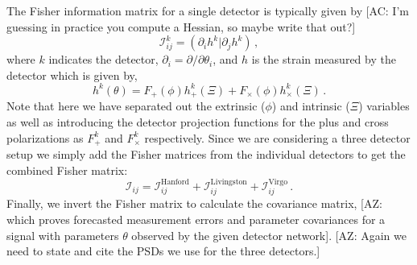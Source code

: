 \documentclass[twocolumn]{aastex631}
\newcommand{\AZ}[1]{{\color{Burnt}[AZ: #1]}}
\newcommand{\amc}[1]{{\color{red}[AC: #1]}}
\begin{document}
The Fisher information matrix for a single detector is typically given by \amc{I'm guessing in practice you compute a Hessian, so maybe write that out?}
\begin{equation}
    \label{eq:fisher}
    \mathcal{I}^{k}_{ij} = (\partial_i h^k | \partial_j h^k) \, ,
\end{equation}
where $k$ indicates the detector, $\partial_i = \partial/\partial \theta_i$, and $h$ is the strain measured by the detector which is given by,
\begin{equation}
    h^k(\theta) = F_+(\phi) h^k_{+}(\Xi) + F_\times(\phi) h^k_{\times}(\Xi) \, .
\end{equation}
Note that here we have separated out the extrinsic ($\phi$) and intrinsic ($\Xi$) variables as well as introducing the detector projection functions for the plus and cross polarizations as $F^k_+$ and $F^k_\times$ respectively.
Since we are considering a three detector setup we simply add the Fisher matrices from the individual detectors to get the combined Fisher matrix:
\begin{equation}
    \mathcal{I}_{ij} =  \mathcal{I}^{\mathrm{Hanford}}_{ij} + \mathcal{I}^{\mathrm{Livingston}}_{ij} + \mathcal{I}^{\mathrm{Virgo}}_{ij}   \, .
\end{equation}
Finally, we invert the Fisher matrix to calculate the covariance matrix,
\AZ{which proves forecasted measurement errors and parameter covariances for a signal with parameters $\theta$ observed by the given detector network}.
\AZ{Again we need to state and cite the PSDs we use for the three detectors.}

\end{document}
